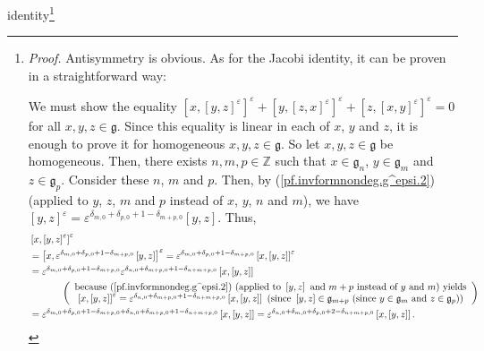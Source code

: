 \documentclass
[numbers=enddot,12pt,final,onecolumn,german,notitlepage]{scrartcl}%
\theoremstyle{definition}
\begin{document}
identity\footnote{\textit{Proof.} Antisymmetry is obvious. As for the Jacobi
identity, it can be proven in a straightforward way:
\par
We must show the equality $\left[  x,\left[  y,z\right]  ^{\varepsilon
}\right]  ^{\varepsilon}+\left[  y,\left[  z,x\right]  ^{\varepsilon}\right]
^{\varepsilon}+\left[  z,\left[  x,y\right]  ^{\varepsilon}\right]
^{\varepsilon}=0$ for all $x,y,z\in\mathfrak{g}$. Since this equality is
linear in each of $x$, $y$ and $z$, it is enough to prove it for homogeneous
$x,y,z\in\mathfrak{g}$. So let $x,y,z\in\mathfrak{g}$ be homogeneous. Then,
there exists $n,m,p\in\mathbb{Z}$ such that $x\in\mathfrak{g}_{n}$,
$y\in\mathfrak{g}_{m}$ and $z\in\mathfrak{g}_{p}$. Consider these $n$, $m$ and
$p$. Then, by (\ref{pf.invformnondeg.g^epsi.2}) (applied to $y$, $z$, $m$ and
$p$ instead of $x$, $y$, $n$ and $m$), we have $\left[  y,z\right]
^{\varepsilon}=\varepsilon^{\delta_{m,0}+\delta_{p,0}+1-\delta_{m+p,0}}\left[
y,z\right]  $. Thus,%
\begin{align*}
&  \left[  x,\left[  y,z\right]  ^{\varepsilon}\right]  ^{\varepsilon}\\
&  =\left[  x,\varepsilon^{\delta_{m,0}+\delta_{p,0}+1-\delta_{m+p,0}}\left[
y,z\right]  \right]  ^{\varepsilon}=\varepsilon^{\delta_{m,0}+\delta
_{p,0}+1-\delta_{m+p,0}}\left[  x,\left[  y,z\right]  \right]  ^{\varepsilon
}\\
&  =\varepsilon^{\delta_{m,0}+\delta_{p,0}+1-\delta_{m+p,0}}\varepsilon
^{\delta_{n,0}+\delta_{m+p,0}+1-\delta_{n+m+p,0}}\left[  x,\left[  y,z\right]
\right] \\
&  \ \ \ \ \ \ \ \ \ \ \left(
\begin{array}
[c]{c}%
\text{because (\ref{pf.invformnondeg.g^epsi.2}) (applied to }\left[
y,z\right]  \text{ and }m+p\text{ instead of }y\text{ and }m\text{) yields}\\
\left[  x,\left[  y,z\right]  \right]  ^{\varepsilon}=\varepsilon
^{\delta_{n,0}+\delta_{m+p,0}+1-\delta_{n+m+p,0}}\left[  x,\left[  y,z\right]
\right]  \text{ (since }\left[  y,z\right]  \in\mathfrak{g}_{m+p}\text{ (since
}y\in\mathfrak{g}_{m}\text{ and }z\in\mathfrak{g}_{p}\text{))}%
\end{array}
\right) \\
&  =\varepsilon^{\delta_{m,0}+\delta_{p,0}+1-\delta_{m+p,0}+\delta
_{n,0}+\delta_{m+p,0}+1-\delta_{n+m+p,0}}\left[  x,\left[  y,z\right]
\right]  =\varepsilon^{\delta_{n,0}+\delta_{m,0}+\delta_{p,0}+2-\delta
_{n+m+p,0}}\left[  x,\left[  y,z\right]  \right]  .
\end{align*}
}
\end{document}
